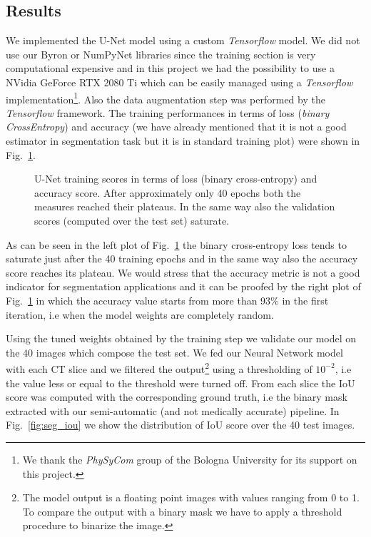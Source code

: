 \documentclass{standalone}
\begin{document}
\subsection[Results]{Results}\label{segmentation:results}

We implemented the U-Net model using a custom \emph{Tensorflow} model.
We did not use our \textsf{Byron} or \textsf{NumPyNet} libraries since the training section is very computational expensive and in this project we had the possibility to use a NVidia GeForce RTX 2080 Ti which can be easily managed using a \emph{Tensorflow} implementation\footnote{
  We thank the \emph{PhySyCom} group of the Bologna University for its support on this project.
}.
Also the data augmentation step was performed by the \emph{Tensorflow} framework.
The training performances in terms of loss (\emph{binary CrossEntropy}) and accuracy (we have already mentioned that it is not a good estimator in segmentation task but it is  in standard training plot) were shown in Fig.~\ref{fig:seg_train}.

\begin{figure}[htbp]
\centering
\def\svgwidth{0.85\textwidth}

\caption{U-Net training scores in terms of loss (binary cross-entropy) and accuracy score.
After approximately only 40 epochs both the measures reached their plateaus.
In the same way also the validation scores (computed over the test set) saturate.
}
\label{fig:seg_train}
\end{figure}

As can be seen in the left plot of Fig.~\ref{fig:seg_train} the binary cross-entropy loss tends to saturate just after the 40 training epochs and in the same way also the accuracy score reaches its plateau.
We would stress that the accuracy metric is not a good indicator for segmentation applications and it can be proofed by the right plot of Fig.~\ref{fig:seg_train} in which the accuracy value starts from more than 93\% in the first iteration, i.e when the model weights are completely random.

Using the tuned weights obtained by the training step we validate our model on the 40 images which compose the test set.
We fed our Neural Network model with each CT slice and we filtered the output\footnote{
  The model output is a floating point images with values ranging from 0 to 1.
  To compare the output with a binary mask we have to apply a threshold procedure to binarize the image.
} using a thresholding of $10^{-2}$, i.e the value less or equal to the threshold were turned off.
From each slice the IoU score was computed with the corresponding ground truth, i.e the binary mask extracted with our semi-automatic (and not medically accurate) pipeline.
In Fig.~\ref{fig:seg_iou} we show the distribution of IoU score over the 40 test images.
\end{document}
